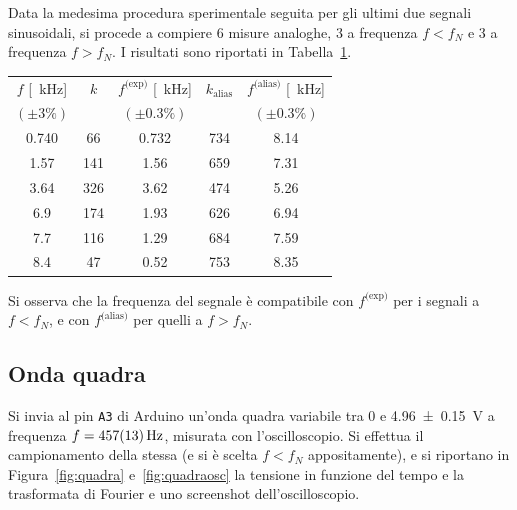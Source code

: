\documentclass[10pt,oneside,a4paper]{article}
\begin{document}
\begin{multicols}{2}
Data la medesima procedura sperimentale seguita per gli ultimi due segnali sinusoidali, si procede a compiere $6$ misure analoghe, $3$ a frequenza $f<f_N$ e $3$ a frequenza $f>f_N$. I risultati sono riportati in Tabella~\ref{tab:misure_sin}.

\begin{table}
\label{tab:misure_sin}
\centering
\begin{tabular}{c|c|c|c|c}
$f$ [\SI{}{\kilo\Hz}] & $k$ & $f^\text{(exp)}$ [\SI{}{\kilo\Hz}] & $k_\text{alias}$ & $f^\text{(alias)}$ [\SI{}{\kilo\Hz}] \\
$(\pm 3\%)$ & & $(\pm 0.3\%)$ &  & $(\pm 0.3\%)$  \\ 
\hline
0.740 &			66  & 0.732	 & 	734 & 8.14 	\\
1.57 & 			141 & 1.56   & 659	& 7.31 \\
3.64 & 			326 & 3.62	 & 474 	& 5.26  \\  
6.9  &			174 & 1.93	 & 626  & 6.94 \\
7.7  & 			116 & 1.29	 & 684  & 7.59 \\
8.4  &			47  & 0.52	 & 753  & 8.35 \\			 
\hline
\end{tabular}
\end{table}

Si osserva che la frequenza del segnale è compatibile con $f^\text{(exp)}$ per i segnali a $f<f_N$, e con $f^\text{(alias)}$ per quelli a $f>f_N$.

\subsection{Onda quadra}
Si invia al pin \texttt{A3} di Arduino un'onda quadra variabile tra $0$ e \SI{4.96 \pm 0.15}{V} a frequenza $f = \SI{457 \pm 13}{\Hz}$, misurata con l'oscilloscopio. Si effettua il campionamento della stessa (e si è scelta $f<f_N$ appositamente), e si riportano in Figura~\ref{fig:quadra} e~\ref{fig:quadraosc} la tensione in funzione del tempo e la trasformata di Fourier e uno screenshot dell'oscilloscopio. 


\end{multicols}
\end{document}
